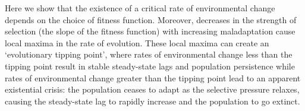 \documentclass[12pt,letterpaper]{article} %
\begin{document}
Here we show that the existence of a critical rate of environmental change depends on the choice of fitness function. 
Moreover, decreases in the strength of selection (the slope of the fitness function) with increasing maladaptation cause local maxima in the rate of evolution.
These local maxima can create an `evolutionary tipping point', where rates of environmental change less than the tipping point result in stable steady-state lags and population persistence while rates of environmental change greater than the tipping point lead to an apparent existential crisis: the population ceases to adapt as the selective pressure relaxes, causing the steady-state lag to rapidly increase and the population to go extinct. 
\end{document}
